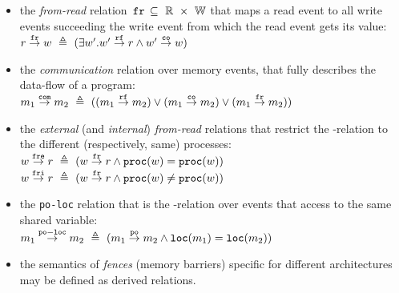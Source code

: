 \begin{itemize}

    \item the \textit{from-read} relation $\,\mathtt{fr}\, \subseteq~\mathbb{R}~\times~\mathbb{W}$ that maps a read event to all write events succeeding the write event from which the read event gets its value: \\
    $r \overset{\mathtt{fr}}{\rightarrow} w ~\triangleq~ (\exists w' . w' \overset{\mathtt{rf}}{\rightarrow} r \land w' \overset{\mathtt{co}}{\rightarrow} w)$


    \item the \textit{communication} relation \com over memory events, that fully describes the data-flow of a program: \\
    $m_1 \overset{\mathtt{com}}{\rightarrow} m_2~\triangleq~((m_1\overset{\mathtt{rf}}{\rightarrow}m_2) \lor (m_1\overset{\mathtt{co}}{\rightarrow}m_2) \lor (m_1\overset{\mathtt{fr}}{\rightarrow}m_2))$

    \item the \textit{external} (and \textit{internal}) \textit{from-read} relations that restrict the \fr-relation to the different (respectively, same) processes: \\
    $w \overset{\mathtt{fre}}{\rightarrow} r ~\triangleq~ (w \overset{\mathtt{fr}}{\rightarrow} r \land \mathtt{proc}(w) = \mathtt{proc}(w))$ \\
    $w \overset{\mathtt{fri}}{\rightarrow} r ~\triangleq~ (w \overset{\mathtt{fr}}{\rightarrow} r \land \mathtt{proc}(w) \neq \mathtt{proc}(w))$
    
    \item the \texttt{po-loc} relation that is the \po-relation over events that access to the same shared variable: \\
    $m_1 \overset{\mathtt{po-loc}}{\rightarrow} m_2 ~\triangleq~ (m_1 \overset{\mathtt{po}}{\rightarrow} m_2 \land \mathtt{loc}(m_1) = \mathtt{loc}(m_2))$

    \item the semantics of \textit{fences} (memory barriers) specific for different architectures may be defined as derived relations.


\end{itemize}

